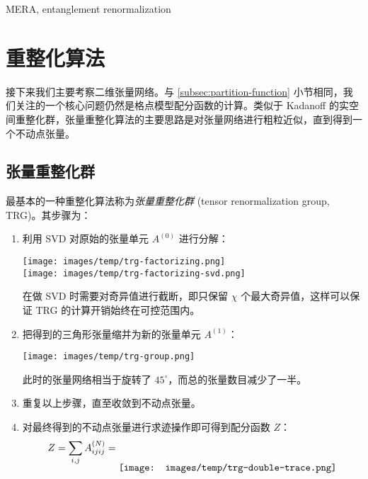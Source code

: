 MERA, entanglement renormalization\cite{vidal2007entanglement,evenbly2009algorithms,konig2009exact,evenbly2014algorithms,evenbly2015tensor2}

\section{重整化算法}

接下来我们主要考察二维张量网络。与 \ref{subsec:partition-function} 小节相同，我们关注的一个核心问题仍然是格点模型配分函数的计算。类似于 Kadanoff 的实空间重整化群\cite{pathria2011statistical}，张量重整化算法的主要思路是对张量网络进行粗粒近似，直到得到一个不动点张量。

\subsection{张量重整化群}

最基本的一种重整化算法称为\emph{张量重整化群} (tensor renormalization group, TRG)\cite{levin2007tensor}。其步骤为：

\begin{enumerate}
  \item 利用 SVD 对原始的张量单元 $A^{(0)}$ 进行分解：
    \begin{center}
      \texttt{[image: images/temp/trg-factorizing.png]} \\
      \texttt{[image: images/temp/trg-factorizing-svd.png]}
    \end{center}
    在做 SVD 时需要对奇异值进行截断，即只保留 $\chi$ 个最大奇异值，这样可以保证 TRG 的计算开销始终在可控范围内。

  \item 把得到的三角形张量缩并为新的张量单元 $A^{(1)}$：
    \begin{center}
      \texttt{[image: images/temp/trg-group.png]}
    \end{center}
    此时的张量网络相当于旋转了 $45^\circ$，而总的张量数目减少了一半。

  \item 重复以上步骤，直至收敛到不动点张量。

  \item 对最终得到的不动点张量进行求迹操作即可得到配分函数 $Z$：
    \begin{equation}
      Z = \sum_{i,j} A^{(N)}_{ijij} = \raisebox{-2em}{\texttt{[image: images/temp/trg-double-trace.png]}}
    \end{equation}
\end{enumerate}

